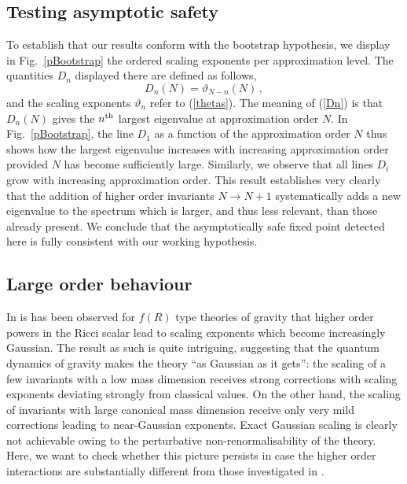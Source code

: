\documentclass[notitlepage,eqsecnum,bm,amsmath,preprintnumbers,superscriptaddress,nofootinbib,aps,11pt]{revtex4-1}
\def\eq#1{(\ref{#1})}
\begin{document}
\subsection{Testing asymptotic safety}
To establish that our results conform with the bootstrap hypothesis, we display in Fig.~\ref{pBootstrap} the ordered scaling exponents per approximation level. The quantities $D_n$ displayed there are defined as follows,
\begin{equation}\label{Dn}
D_n(N)=\vartheta_{N-n}(N)\,,
\end{equation}
and the scaling exponents $\vartheta_{n}$ refer to \eq{thetas}. The meaning of \eq{Dn} is that $D_n(N)$ gives the $n^{\rm th}$ largest eigenvalue at approximation order $N$. In Fig.~\ref{pBootstrap}, the line $D_1$ as a function of the approximation order $N$ thus shows how the largest eigenvalue increases with increasing approximation order provided $N$ has become sufficiently large. Similarly, we observe that all lines $D_i$ grow with increasing approximation order. This result establishes very clearly that the addition of higher order invariants $N\to N+1$ systematically adds a new eigenvalue to the spectrum which is larger, and thus less relevant, than those already present. We conclude that the asymptotically safe fixed point detected here is fully consistent with our working hypothesis.







 \subsection{Large order behaviour}
  In \cite{Falls:2013bv,Falls:2014tra} is has been observed for $f(R)$ type theories of gravity that higher order powers in the Ricci scalar lead to scaling exponents which become increasingly Gaussian. The result as such is quite intriguing, suggesting that the quantum dynamics of gravity makes the theory ``as Gaussian as it gets'': the scaling of a few invariants with a low mass dimension receives strong corrections with scaling exponents deviating strongly from classical values. On the other hand, the scaling of invariants with large canonical mass dimension receive only very mild corrections leading to near-Gaussian exponents.  Exact Gaussian scaling is clearly not achievable owing to the perturbative non-renormalisability of the theory. Here, we want to check whether this picture persists in case the higher order interactions are substantially different from those investigated in \cite{Falls:2013bv,Falls:2014tra}. 
\end{document}
